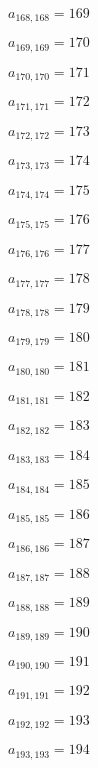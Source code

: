 \documentclass[a4paper,12pt]{article}
\begin{document}
$a _{ 168, 168 } = 169$

$a _{ 169, 169 } = 170$

$a _{ 170, 170 } = 171$

$a _{ 171, 171 } = 172$

$a _{ 172, 172 } = 173$

$a _{ 173, 173 } = 174$

$a _{ 174, 174 } = 175$

$a _{ 175, 175 } = 176$

$a _{ 176, 176 } = 177$

$a _{ 177, 177 } = 178$

$a _{ 178, 178 } = 179$

$a _{ 179, 179 } = 180$

$a _{ 180, 180 } = 181$

$a _{ 181, 181 } = 182$

$a _{ 182, 182 } = 183$

$a _{ 183, 183 } = 184$

$a _{ 184, 184 } = 185$

$a _{ 185, 185 } = 186$

$a _{ 186, 186 } = 187$

$a _{ 187, 187 } = 188$

$a _{ 188, 188 } = 189$

$a _{ 189, 189 } = 190$

$a _{ 190, 190 } = 191$

$a _{ 191, 191 } = 192$

$a _{ 192, 192 } = 193$

$a _{ 193, 193 } = 194$
\end{document}
